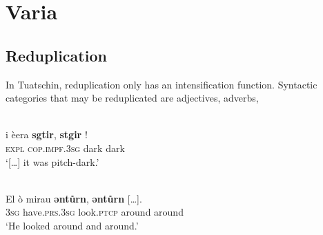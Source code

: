 \chapter{Varia}

\section{Reduplication}
In Tuatschin, reduplication only has an intensification function. Syntactic categories that may be reduplicated are adjectives, adverbs,

\ea\label{}
\\
\gll  […] i èera \textbf{sgtir}, \textbf{stgir} !\\
     […]  \textsc{expl} \textsc{cop.impf.3sg} dark dark\\
\glt `[…] it was pitch-dark.'
\z

\ea\label{}
\\
\gll El ò mirau \textbf{ǝntůrn}, \textbf{ǝntůrn} […].\\
     \textsc{3sg} have.\textsc{prs.3sg} look.\textsc{ptcp} around around \\
\glt `He looked around and around.'
\z
